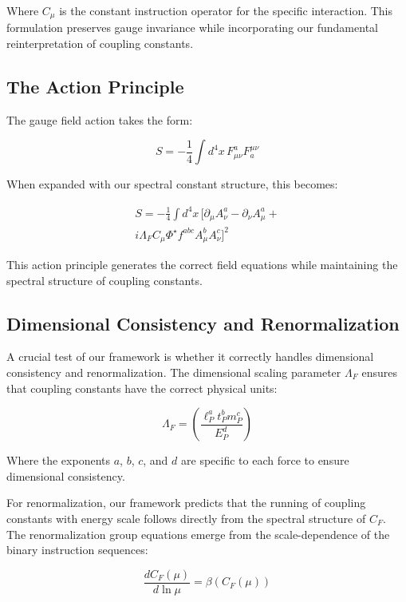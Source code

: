 \documentclass{article}
\begin{document}
Where $C_\mu$ is the constant instruction operator for the specific interaction. This formulation preserves gauge invariance while incorporating our fundamental reinterpretation of coupling constants.

\subsection{The Action Principle}

The gauge field action takes the form:

\begin{equation}
S = -\frac{1}{4}\int d^4x \, F_{\mu\nu}^a F^{\mu\nu}_a
\end{equation}

When expanded with our spectral constant structure, this becomes:

\begin{multline}
S = -\frac{1}{4}\int d^4x \, \Bigg[\partial_\mu A_\nu^a - \partial_\nu A_\mu^a + \\
i\Lambda_F C_\mu \Phi^\star f^{abc}A_\mu^b A_\nu^c\Bigg]^2
\end{multline}

This action principle generates the correct field equations while maintaining the spectral structure of coupling constants.

\subsection{Dimensional Consistency and Renormalization}

A crucial test of our framework is whether it correctly handles dimensional consistency and renormalization. The dimensional scaling parameter $\Lambda_F$ ensures that coupling constants have the correct physical units:

\begin{equation}
\Lambda_F = \left( \frac{\ell_P^a t_P^b m_P^c}{E_P^d} \right)
\end{equation}

Where the exponents $a$, $b$, $c$, and $d$ are specific to each force to ensure dimensional consistency.

For renormalization, our framework predicts that the running of coupling constants with energy scale follows directly from the spectral structure of $C_F$. The renormalization group equations emerge from the scale-dependence of the binary instruction sequences:

\begin{equation}
\frac{d C_F(\mu)}{d \ln \mu} = \beta(C_F(\mu))
\end{equation}
\end{document}
